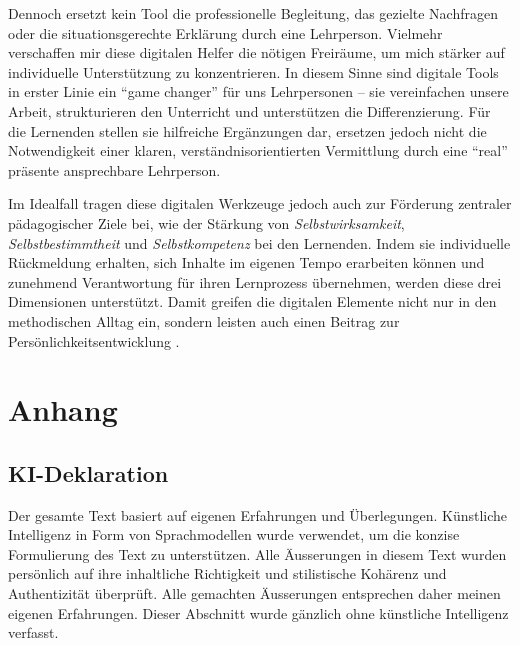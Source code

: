 Dennoch ersetzt kein Tool die professionelle Begleitung, das gezielte Nachfragen oder die situationsgerechte Erklärung durch eine Lehrperson. Vielmehr verschaffen mir diese digitalen Helfer die nötigen Freiräume, um mich stärker auf individuelle Unterstützung zu konzentrieren. In diesem Sinne sind digitale Tools in erster Linie ein \enquote{game changer} für uns Lehrpersonen -- sie vereinfachen unsere Arbeit, strukturieren den Unterricht und unterstützen die Differenzierung. Für die Lernenden stellen sie hilfreiche Ergänzungen dar, ersetzen jedoch nicht die Notwendigkeit einer klaren, verständnisorientierten Vermittlung durch eine \enquote{real} präsente ansprechbare Lehrperson.

Im Idealfall tragen diese digitalen Werkzeuge jedoch auch zur Förderung zentraler pädagogischer Ziele bei, wie der Stärkung von \emph{Selbstwirksamkeit}, \emph{Selbstbestimmtheit} und \emph{Selbstkompetenz} bei den Lernenden. Indem sie individuelle Rückmeldung erhalten, sich Inhalte im eigenen Tempo erarbeiten können und zunehmend Verantwortung für ihren Lernprozess übernehmen, werden diese drei Dimensionen unterstützt. Damit greifen die digitalen Elemente nicht nur in den methodischen Alltag ein, sondern leisten auch einen Beitrag zur Persönlichkeitsentwicklung \cite{alma991170251641605501}.



\appendix
\section{Anhang}
\subsection{KI-Deklaration}

Der gesamte Text basiert auf eigenen Erfahrungen und Überlegungen. Künstliche Intelligenz in Form von Sprachmodellen wurde verwendet, um die konzise Formulierung des Text zu unterstützen. Alle Äusserungen in diesem Text wurden persönlich auf ihre inhaltliche Richtigkeit und stilistische Kohärenz und Authentizität überprüft. Alle gemachten Äusserungen entsprechen daher meinen eigenen Erfahrungen. Dieser Abschnitt wurde gänzlich ohne künstliche Intelligenz verfasst.

\printbibliography[heading=bibsubsection]

